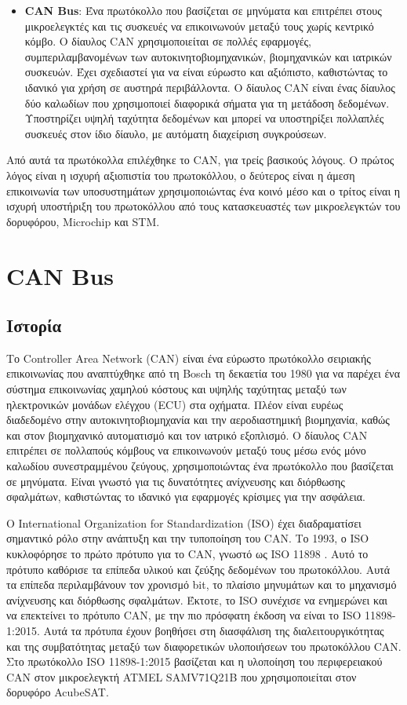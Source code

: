 \documentclass[a4paper,nobib,justified]{tufte-book}
\begin{document}
\begin{itemize}
	\item \textbf{CAN Bus}: Ένα πρωτόκολλο που βασίζεται σε μηνύματα και επιτρέπει στους μικροελεγκτές και τις συσκευές να επικοινωνούν μεταξύ τους χωρίς κεντρικό κόμβο. Ο δίαυλος CAN χρησιμοποιείται σε πολλές εφαρμογές, συμπεριλαμβανομένων των αυτοκινητοβιομηχανικών, βιομηχανικών και ιατρικών συσκευών. Έχει σχεδιαστεί για να είναι εύρωστο και αξιόπιστο, καθιστώντας το ιδανικό για χρήση σε αυστηρά περιβάλλοντα. Ο δίαυλος CAN είναι ένας δίαυλος δύο καλωδίων που χρησιμοποιεί διαφορικά σήματα για τη μετάδοση δεδομένων. Υποστηρίζει υψηλή ταχύτητα δεδομένων και μπορεί να υποστηρίξει πολλαπλές συσκευές στον ίδιο δίαυλο, με αυτόματη διαχείριση συγκρούσεων. 
\end{itemize}

Από αυτά τα πρωτόκολλα επιλέχθηκε το \acs{CAN}, για τρείς βασικούς λόγους. Ο πρώτος λόγος είναι η ισχυρή αξιοπιστία του πρωτοκόλλου, ο δεύτερος είναι η άμεση επικοινωνία των υποσυστημάτων χρησιμοποιώντας ένα κοινό μέσο και ο τρίτος είναι η ισχυρή υποστήριξη του πρωτοκόλλου από τους κατασκευαστές των μικροελεγκτών του δορυφόρου, Microchip και STM.

\section{CAN Bus}
\label{canbus}
\subsection{Ιστορία}
Το Controller Area Network (CAN) είναι ένα εύρωστο πρωτόκολλο σειριακής επικοινωνίας που αναπτύχθηκε από τη Bosch τη δεκαετία του 1980 για να παρέχει ένα σύστημα επικοινωνίας χαμηλού κόστους και υψηλής ταχύτητας μεταξύ των ηλεκτρονικών μονάδων ελέγχου (ECU) στα οχήματα. Πλέον είναι ευρέως διαδεδομένο στην αυτοκινητοβιομηχανία και την αεροδιαστημική βιομηχανία, καθώς και στον βιομηχανικό αυτοματισμό και τον ιατρικό εξοπλισμό. Ο δίαυλος CAN επιτρέπει σε πολλαπούς κόμβους να επικοινωνούν μεταξύ τους μέσω ενός μόνο καλωδίου συνεστραμμένου ζεύγους, χρησιμοποιώντας ένα πρωτόκολλο που βασίζεται σε μηνύματα. Είναι γνωστό για τις δυνατότητες ανίχνευσης και διόρθωσης σφαλμάτων, καθιστώντας το ιδανικό για εφαρμογές κρίσιμες για την ασφάλεια.

Ο International Organization for Standardization (ISO) έχει διαδραματίσει σημαντικό ρόλο στην ανάπτυξη και την τυποποίηση του CAN. Το 1993, ο ISO κυκλοφόρησε το πρώτο πρότυπο για το CAN, γνωστό ως ISO 11898 . Αυτό το πρότυπο καθόρισε τα επίπεδα υλικού και ζεύξης δεδομένων του πρωτοκόλλου. Αυτά τα επίπεδα περιλαμβάνουν τον χρονισμό bit, το πλαίσιο μηνυμάτων και το μηχανισμό ανίχνευσης και διόρθωσης σφαλμάτων. Έκτοτε, το ISO συνέχισε να ενημερώνει και να επεκτείνει το πρότυπο CAN, με την πιο πρόσφατη έκδοση να είναι το ISO 11898-1:2015. Αυτά τα πρότυπα έχουν βοηθήσει στη διασφάλιση της διαλειτουργικότητας και της συμβατότητας μεταξύ των διαφορετικών υλοποιήσεων του πρωτοκόλλου CAN. Στο πρωτόκολλο ISO 11898-1:2015 βασίζεται και η υλοποίηση του περιφερειακού CAN στον μικροελεγκτή ATMEL SAMV71Q21B που χρησιμοποιείται στον δορυφόρο AcubeSAT.
\end{document}
